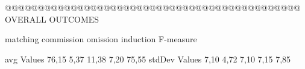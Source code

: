  @@@@@@@@@@@@@@@@@@@@@@@@@@@@@@@@@@@@@@@@@@@@@ OVERALL OUTCOMES

              matching commission   omission  induction  F-measure

avg Values      76,15    5,37       11,38      7,20       75,55       
stdDev Values    7,10    4,72        7,10      7,15        7,85       
